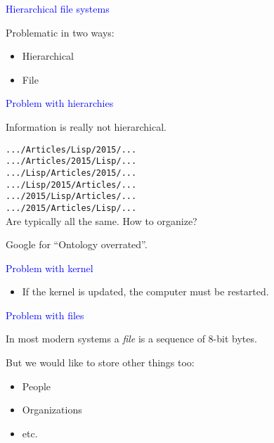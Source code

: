 \documentclass{slides}
\newcommand{\ti}[1]{\begin{center}\Large{\textcolor{blue}{#1}}\end{center}}
\begin{document}
\begin{slide}\ti{Hierarchical file systems}
\vskip 0.5cm
Problematic in two ways:

\begin{itemize}
\item Hierarchical
\item File
\end{itemize}

\vfill\end{slide}
\begin{slide}\ti{Problem with hierarchies}
\vskip 0.5cm
Information is really not hierarchical. 

\texttt{.../Articles/Lisp/2015/...}\\
\texttt{.../Articles/2015/Lisp/...}\\
\texttt{.../Lisp/Articles/2015/...}\\
\texttt{.../Lisp/2015/Articles/...}\\
\texttt{.../2015/Lisp/Articles/...}\\
\texttt{.../2015/Articles/Lisp/...}\\

Are typically all the same.  How to organize?

Google for ``Ontology overrated''.

\vfill\end{slide}
\begin{slide}\ti{Problem with kernel}
\vskip 0.5cm
\begin{itemize}
\item If the kernel is updated, the computer must be restarted.
\end{itemize}

\vfill\end{slide}
\begin{slide}\ti{Problem with files}
\vskip 0.5cm
In most modern systems a \emph{file} is a sequence of 8-bit bytes.

But we would like to store other things too:

\begin{itemize}
\item People
\item Organizations
\item etc.
\end{itemize}

\vfill\end{slide}
\end{document}
